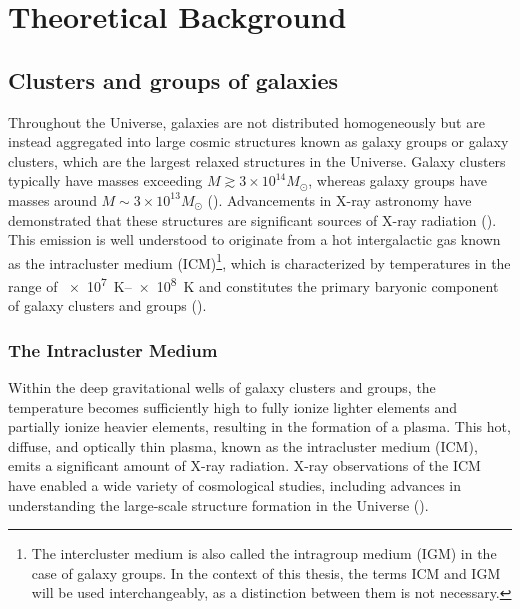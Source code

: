 
\chapter{Theoretical Background}
\label{sec:theoretical_background}
\section{Clusters and groups of galaxies}\label{sec:clusters}
Throughout the Universe, galaxies are not distributed homogeneously but are instead aggregated into large cosmic structures known as galaxy groups or galaxy clusters, which are the largest relaxed structures in the Universe. Galaxy clusters typically have masses exceeding \(M \gtrsim 3 \times 10^{14} M_{\odot}\), whereas galaxy groups have masses around \(M \sim 3 \times 10^{13} M_{\odot}\) (\cite{Schneider_2006}). Advancements in X-ray astronomy have demonstrated that these structures are significant sources of X-ray radiation (\cite{Cavaliere_1971}). This emission is well understood to originate from a hot intergalactic gas known as the intracluster medium (ICM)\footnote{The intercluster medium is also called the intragroup medium (IGM) in the case of galaxy groups. In the context of this thesis, the terms ICM and IGM will be used interchangeably, as a distinction between them is not necessary.}, which is characterized by temperatures in the range of \SIrange{e7}{e8}{\kelvin} and constitutes the primary baryonic component of galaxy clusters and groups (\cite{Schneider_2006}).
%
\subsection{The Intracluster Medium}
Within the deep gravitational wells of galaxy clusters and groups, the temperature becomes sufficiently high to fully ionize lighter elements and partially ionize heavier elements, resulting in the formation of a plasma. This hot, diffuse, and optically thin plasma, known as the intracluster medium (ICM), emits a significant amount of X-ray radiation. X-ray observations of the ICM have enabled a wide variety of cosmological studies, including advances in understanding the large-scale structure formation in the Universe (\cite{KravtsovBorgani2012}).
%
